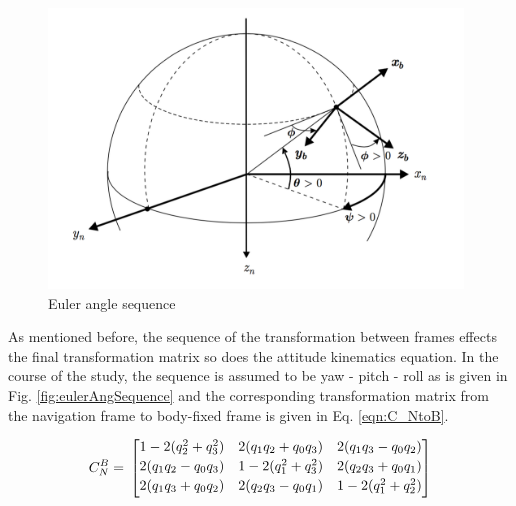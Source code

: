\begin{figure}
\begin{center}
\includegraphics[width=11cm]{figures/eulerAnglesAircraft}    %
\caption{Euler angle sequence \cite{ducard2009fault}} 
\label{fig:eulerAnglesAircraft}
\end{center}
\end{figure}
	
As mentioned before, the sequence of the transformation between frames effects the final transformation matrix so does the attitude kinematics equation. In the course of the study, the sequence is assumed to be yaw - pitch - roll as is given in Fig. \ref{fig:eulerAngSequence} and the corresponding transformation matrix from the navigation frame to body-fixed frame is given in Eq. \ref{eqn:C_NtoB}.

\begin{equation}{\label{eqn:C_NtoB}}
C_N^B
= \,
\begin{bmatrix}
1 - 2(q_2^2 + q_3^2) & 2(q_1 q_2 + q_0 q_3) & 2(q_1 q_3 - q_0 q_2)  \\[0.2em]
2(q_1 q_2 - q_0 q_3) & 1 - 2(q_1^2 + q_3^2) & 2(q_2 q_3 + q_0 q_1)\\[0.2em]
2(q_1 q_3 + q_0 q_2) & 2(q_2 q_3 - q_0 q_1) & 1 - 2(q_1^2 + q_2^2) \\[0.2em]
\end{bmatrix}
\end{equation}

